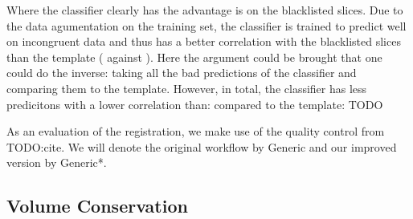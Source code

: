 Where the classifier clearly has the advantage is on the blacklisted slices.
Due to the data agumentation on the training set, the classifier is trained to predict well on incongruent data and thus has a better correlation with the blacklisted slices than the template ( against ).
Here the argument could be brought that one could do the inverse: taking all the bad predictions of the classifier and comparing them to the template.
However, in total, the classifier has less predicitons with a lower correlation than: compared to the template: TODO
\fi



As an evaluation of the registration, we make use of the quality control from TODO:cite.
We will denote the original workflow by Generic and our improved version by Generic*.

\subsection{Volume Conservation}

